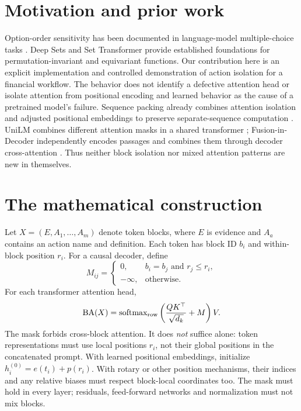 \documentclass[11pt]{article}
\begin{document}
\section{Motivation and prior work}
Option-order sensitivity has been documented in language-model multiple-choice tasks \cite{order}. Deep Sets \cite{deep} and Set Transformer \cite{set} provide established foundations for permutation-invariant and equivariant functions. Our contribution here is an explicit implementation and controlled demonstration of action isolation for a financial workflow. The behavior does not identify a defective attention head or isolate attention from positional encoding and learned behavior as the cause of a pretrained model's failure. Sequence packing already combines attention isolation and adjusted positional embeddings to preserve separate-sequence computation \cite{packing}. UniLM combines different attention masks in a shared transformer \cite{unilm}; Fusion-in-Decoder independently encodes passages and combines them through decoder cross-attention \cite{fid}. Thus neither block isolation nor mixed attention patterns are new in themselves.
\newpage
\section{The mathematical construction}
Let $X=(E,A_1,\ldots,A_m)$ denote token blocks, where $E$ is evidence and $A_a$ contains an action name and definition. Each token has block ID $b_i$ and within-block position $r_i$. For a causal decoder, define
\begin{equation}
M_{ij}=\begin{cases}0,&b_i=b_j\text{ and }r_j\le r_i,\\-\infty,&\text{otherwise}.\end{cases}
\end{equation}
For each transformer attention head,
\begin{equation}
\operatorname{BA}(X)=\operatorname{softmax}_{\rm row}\left(\frac{QK^\top}{\sqrt{d_k}}+M\right)V.
\end{equation}
The mask forbids cross-block attention. It does \emph{not} suffice alone: token representations must use local positions $r_i$, not their global positions in the concatenated prompt. With learned positional embeddings, initialize $h_i^{(0)}=e(t_i)+p(r_i)$. With rotary or other position mechanisms, their indices and any relative biases must respect block-local coordinates too. The mask must hold in every layer; residuals, feed-forward networks and normalization must not mix blocks.
\end{document}
